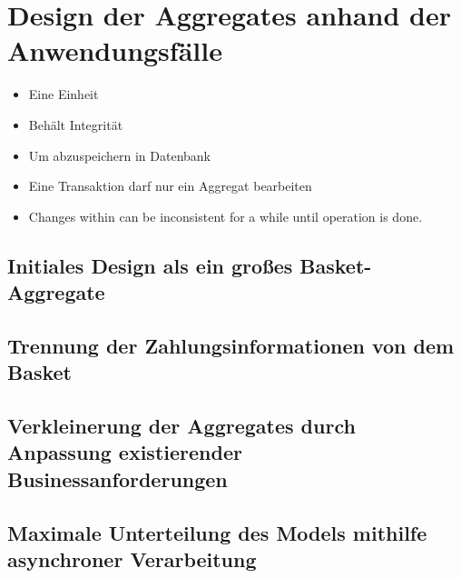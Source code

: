 \chapter{Design der Aggregates anhand der Anwendungsfälle}
\begin{itemize}[noitemsep,nolistsep]
	\item Eine Einheit
	\item Behält Integrität
	\item Um abzuspeichern in Datenbank
	\item Eine Transaktion darf nur ein Aggregat bearbeiten
	\item Changes within can be inconsistent for a while until operation is done.
\end{itemize}

\section{Initiales Design als ein großes Basket-Aggregate}
\blindtext

\section{Trennung der Zahlungsinformationen von dem Basket}
\blindtext

\section{Verkleinerung der Aggregates durch Anpassung existierender Businessanforderungen }
\blindtext

\section{Maximale Unterteilung des Models mithilfe asynchroner Verarbeitung }
\blindtext
